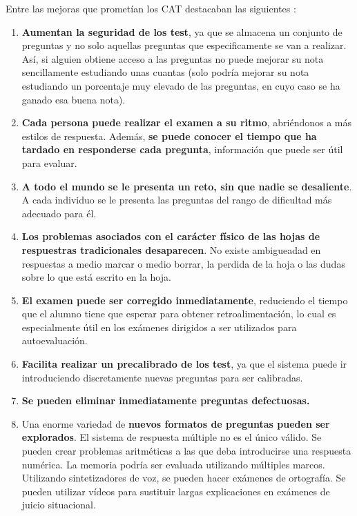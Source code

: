 Entre las mejoras que prometían los \acrshort{CAT} destacaban las siguientes \cite{Green83}:

\begin{enumerate}
	\item \textbf{Aumentan la seguridad de los test}, ya que se almacena un conjunto de preguntas y no solo aquellas preguntas que especificamente se van a realizar. Así, si alguien obtiene acceso a las preguntas no puede mejorar su nota sencillamente estudiando unas cuantas (solo podría mejorar su nota estudiando un porcentaje muy elevado de las preguntas, en cuyo caso se ha ganado esa buena nota).
	\item \textbf{Cada persona puede realizar el examen a su ritmo}, abriéndonos a más estilos de respuesta. Además, \textbf{se puede conocer el tiempo que ha tardado en responderse cada pregunta}, información que puede ser útil para evaluar.
	\item \textbf{A todo el mundo se le presenta un reto, sin que nadie se desaliente}. A cada individuo se le presenta las preguntas del rango de dificultad más adecuado para él.
	\item \textbf{Los problemas asociados con el carácter físico de las hojas de respuestras tradicionales desaparecen}. No existe ambigueadad en respuestas a medio marcar o medio borrar, la perdida de la hoja o las dudas sobre lo que está escrito en la hoja.
	\item \textbf{El examen puede ser corregido inmediatamente}, reduciendo el tiempo que el alumno tiene que esperar para obtener retroalimentación, lo cual es especialmente útil en los exámenes dirigidos a ser utilizados para autoevaluación.
	\item \textbf{Facilita realizar un precalibrado de los test}, ya que el sistema puede ir introduciendo discretamente nuevas preguntas para ser calibradas.
	\item \textbf{Se pueden eliminar inmediatamente preguntas defectuosas.}
	\item Una enorme variedad de \textbf{nuevos formatos de preguntas pueden ser explorados}. El sistema de respuesta múltiple no es el único válido. Se pueden crear problemas aritméticas a las que deba introducirse una respuesta numérica. La memoria podría ser evaluada utilizando múltiples marcos. Utilizando sintetizadores de voz, se pueden hacer exámenes de ortografía. Se pueden utilizar vídeos para sustituir largas explicaciones en exámenes de juicio situacional.
\end{enumerate}

